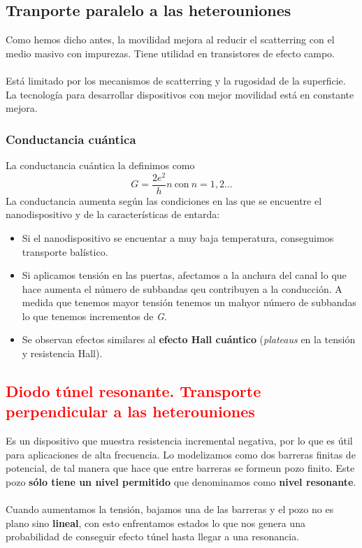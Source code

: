 \subsection{Tranporte paralelo a las heterouniones}
Como hemos dicho antes, la movilidad mejora al reducir el scatterring con el medio masivo con impurezas. Tiene utilidad en transistores de efecto campo.\\\\
Está limitado por los mecanismos de scatterring y la rugosidad de la superficie. La tecnología para desarrollar dispositivos con mejor movilidad está en constante mejora.
\subsubsection{Conductancia cuántica}
La conductancia cuántica la definimos como 
\begin{equation}
    G=\frac{2e^2}{h}n \ \text{con} \ n=1,2...
\end{equation}
La conductancia aumenta según las condiciones en las que se encuentre el nanodispositivo y de la características de entarda:
\begin{itemize}
    \item Si el nanodispositivo se encuentar a muy baja temperatura, conseguimos transporte balístico.
    \item Si aplicamos tensión en las puertas, afectamos a la anchura del canal lo que hace aumenta el número de subbandas qeu contribuyen a la conducción. A medida que tenemos mayor tensión tenemos un mahyor número de subbandas lo que tenemos incrementos de \textit{G}.
    \item Se observan efectos similares al \textbf{efecto Hall cuántico} (\textit{plateaus} en la tensión y resistencia Hall).
\end{itemize}
\subsection{\textcolor{red}{Diodo túnel resonante. Transporte perpendicular a las heterouniones}}
Es un dispositivo que muestra resistencia incremental negativa, por lo que es útil para aplicaciones de alta frecuencia. Lo modelizamos como dos barreras finitas de potencial, de tal manera que hace que entre barreras se formeun pozo finito. Este pozo \textbf{sólo tiene un nivel permitido} que denominamos como \textbf{nivel resonante}.\\\\
Cuando aumentamos la tensión, bajamos una de las barreras y el pozo no es plano sino \textbf{lineal}, con esto enfrentamos estados lo que nos genera una probabilidad de conseguir efecto túnel hasta llegar a una resonancia.
\newpage
